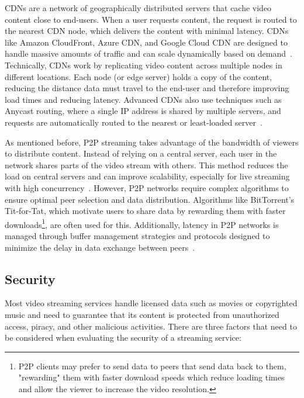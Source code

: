\ac{CDN}s are a network of geographically distributed servers that cache video content close to end-users. When a user requests content, the request is routed to the nearest \ac{CDN} node, which delivers the content with minimal latency. \ac{CDN}s like Amazon CloudFront, Azure CDN, and Google Cloud CDN are designed to handle massive amounts of traffic and can scale dynamically based on demand~\parencite{cdn_basic}.
Technically, \ac{CDN}s work by replicating video content across multiple nodes in different locations. Each node (or edge server) holds a copy of the content, reducing the distance data must travel to the end-user and therefore improving load times and reducing latency. Advanced \ac{CDN}s also use techniques such as Anycast routing, where a single IP address is shared by multiple servers, and requests are automatically routed to the nearest or least-loaded server~\parencite{cdn_basic}.
    
As mentioned before, \ac{P2P} streaming takes advantage of the bandwidth of viewers to distribute content. Instead of relying on a central server, each user in the network shares parts of the video stream with others. This method reduces the load on central servers and can improve scalability, especially for live streaming with high concurrency~\parencite{cdn_basic}.
However, \ac{P2P} networks require complex algorithms to ensure optimal peer selection and data distribution. Algorithms like BitTorrent's Tit-for-Tat, which motivate users to share data by rewarding them with faster downloads\footnote{\ac{P2P} clients may prefer to send data to peers that send data back to them, "rewarding" them with faster download speeds which reduce loading times and allow the viewer to increase the video resolution.}, are often used for this. Additionally, latency in \ac{P2P} networks is managed through buffer management strategies and protocols designed to minimize the delay in data exchange between peers~\parencite{p2p}.

\subsection{Security}

Most video streaming services handle licensed data such as movies or copyrighted music and need to guarantee that its content is protected from unauthorized access, piracy, and other malicious activities.
There are three factors that need to be considered when evaluating the security of a streaming service: 

